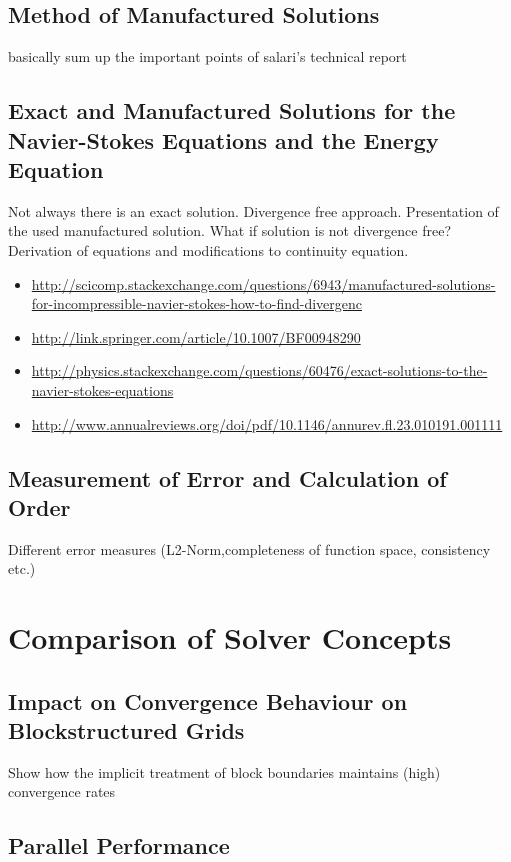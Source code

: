 \documentclass[article,type=msc,colorback,accentcolor=tud2a]{tudthesis}
\begin{document}
    \subsection{Method of Manufactured Solutions}
      basically sum up the important points of salari's technical report
    \subsection{Exact and Manufactured Solutions for the Navier-Stokes Equations and the Energy Equation}
    Not always there is an exact solution. Divergence free approach. Presentation of the used manufactured solution. What if solution is not divergence free? Derivation of equations and modifications to continuity equation.
    \begin{itemize}
      \item \url{http://scicomp.stackexchange.com/questions/6943/manufactured-solutions-for-incompressible-navier-stokes-how-to-find-divergenc}
      \item \url{http://link.springer.com/article/10.1007/BF00948290}
      \item \url{http://physics.stackexchange.com/questions/60476/exact-solutions-to-the-navier-stokes-equations}
      \item \url{http://www.annualreviews.org/doi/pdf/10.1146/annurev.fl.23.010191.001111}
    \end{itemize}
    \subsection{Measurement of Error and Calculation of Order}
      Different error measures (L2-Norm,completeness of function space, consistency etc.)

  \section{Comparison of Solver Concepts}
  
    \subsection{Impact on Convergence Behaviour on Blockstructured Grids}

      Show how the implicit treatment of block boundaries maintains (high) convergence rates

    \subsection{Parallel Performance}
\end{document}
